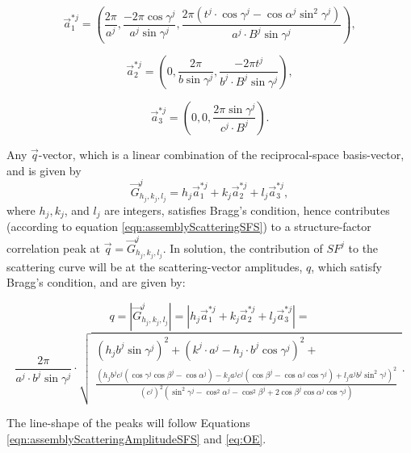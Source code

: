 \documentclass[../D+Manual.tex]{subfiles}
\begin{document}
\begin{equation*}
\vec{a}_{1}^{*j}=\left(\frac{2\pi}{a^j},\frac{-2\pi\cos\gamma^j}{a^j\sin\gamma^j},\frac{2\pi\left(t^j\cdot\cos\gamma^j-\cos\alpha^j\sin^{2}\gamma^j\right)}{a^j\cdot B^j\sin\gamma^j}\right),
\end{equation*}


\begin{equation*}
\vec{a}_{2}^{*j}=\left(0,\frac{2\pi}{b\sin\gamma^j},\frac{-2\pi t^j}{b^j\cdot B^j\sin\gamma^j}\right),
\end{equation*}


\begin{equation*}
\vec{a}_{3}^{*j}=\left(0,0,\frac{2\pi\sin\gamma^j}{c^j\cdot B^j}\right).
\end{equation*}

Any $\vec{q}$-vector, which is a linear combination of the reciprocal-space basis-vector, and is given by
\begin{equation*}
\vec{G}^j_{h_j,k_j,l_j}=h_j\vec{a}_{1}^{*j}+k_j\vec{a}_{2}^{*j}+l_j\vec{a}_{3}^{*j},
\end{equation*}
where $h_j,k_j$, and $l_j$ are integers, satisfies Bragg's condition, hence contributes (according to equation \ref{eqn:assemblyScatteringSFS}) to a structure-factor correlation peak at $\vec{q}=\vec{G}^j_{h_j,k_j,l_j}$. In solution, the contribution of $SF^j$ to the scattering curve will be at the scattering-vector amplitudes, $q$, which satisfy Bragg's condition, and are given by:

\begin{equation*}
q=\left|\vec{G}^j_{h_j,k_j,l_j}\right|=\left|h_j\vec{a}_{1}^{*j}+k_j\vec{a}_{2}^{*j}+l_j\vec{a}_{3}^{*j}\right|=
\end{equation*}
\begin{equation*}
\frac{2\pi}{a^j\cdot b^j\sin\gamma^j}\cdot
\sqrt{\begin{array}{c}
\left(h_jb^j\sin\gamma^j\right)^{2}+\left(k^j\cdot a^j-h_j\cdot b^j\cos\gamma^j\right)^{2}+\\
\frac{\left(h_jb^jc^j\left(\cos\gamma^j\cos\beta^j-\cos\alpha^j\right)-k_ja^jc^j\left(\cos\beta^j-\cos\alpha^j\cos\gamma^j\right)+l_ja^jb^j\sin^{2}\gamma^j\right)^{2}}{\left(c^j\right)^{2}\left(\sin^{2}\gamma^j-\cos^{2}\alpha^j-\cos^{2}\beta^j+2\cos\beta^j\cos\alpha^j\cos\gamma^j\right)}
\end{array}}.
\end{equation*}

\noindent The line-shape of the peaks will follow Equations \ref{eqn:assemblyScatteringAmplitudeSFS} and \ref{eq:OE}.
\end{document}
